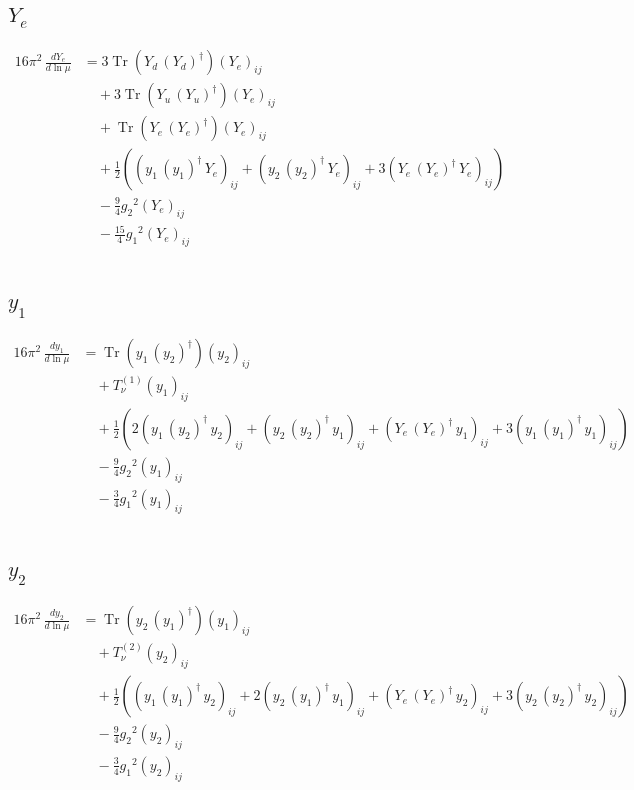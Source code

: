 \documentclass[10pt,a4paper]{article}
\begin{document}
\subsection*{$Y_e$}
\begin{align*}
16\pi^2\,\frac{d Y_e}{d\ln\mu} &=3 \operatorname{Tr}\!\left({Y_d}\,\left({Y_d}\right)^{\dagger}\right) \left({Y_e}\right)_{ij} \\
&\quad +3 \operatorname{Tr}\!\left({Y_u}\,\left({Y_u}\right)^{\dagger}\right) \left({Y_e}\right)_{ij} \\
&\quad +\operatorname{Tr}\!\left({Y_e}\,\left({Y_e}\right)^{\dagger}\right) \left({Y_e}\right)_{ij} \\
&\quad +\frac{1}{2} (\left({y_1}\,\left({y_1}\right)^{\dagger}\,{Y_e}\right)_{ij}+\left({y_2}\,\left({y_2}\right)^{\dagger}\,{Y_e}\right)_{ij}+3 \left({Y_e}\,\left({Y_e}\right)^{\dagger}\,{Y_e}\right)_{ij}) \\
&\quad -\frac{9}{4} {g_2}^2 \left({Y_e}\right)_{ij} \\
&\quad -\frac{15}{4} {g_1}^2 \left({Y_e}\right)_{ij} \\
\end{align*}
\subsection*{$y_1$}
\begin{align*}
16\pi^2\,\frac{d y_1}{d\ln\mu} &=\operatorname{Tr}\!\left({y_1}\,\left({y_2}\right)^{\dagger}\right) \left({y_2}\right)_{ij} \\
&\quad +T_{\nu}^{(1)} \left({y_1}\right)_{ij} \\
&\quad +\frac{1}{2} (2 \left({y_1}\,\left({y_2}\right)^{\dagger}\,{y_2}\right)_{ij}+\left({y_2}\,\left({y_2}\right)^{\dagger}\,{y_1}\right)_{ij}+\left({Y_e}\,\left({Y_e}\right)^{\dagger}\,{y_1}\right)_{ij}+3 \left({y_1}\,\left({y_1}\right)^{\dagger}\,{y_1}\right)_{ij}) \\
&\quad -\frac{9}{4} {g_2}^2 \left({y_1}\right)_{ij} \\
&\quad -\frac{3}{4} {g_1}^2 \left({y_1}\right)_{ij} \\
\end{align*}
\subsection*{$y_2$}
\begin{align*}
16\pi^2\,\frac{d y_2}{d\ln\mu} &=\operatorname{Tr}\!\left({y_2}\,\left({y_1}\right)^{\dagger}\right) \left({y_1}\right)_{ij} \\
&\quad +T_{\nu}^{(2)} \left({y_2}\right)_{ij} \\
&\quad +\frac{1}{2} (\left({y_1}\,\left({y_1}\right)^{\dagger}\,{y_2}\right)_{ij}+2 \left({y_2}\,\left({y_1}\right)^{\dagger}\,{y_1}\right)_{ij}+\left({Y_e}\,\left({Y_e}\right)^{\dagger}\,{y_2}\right)_{ij}+3 \left({y_2}\,\left({y_2}\right)^{\dagger}\,{y_2}\right)_{ij}) \\
&\quad -\frac{9}{4} {g_2}^2 \left({y_2}\right)_{ij} \\
&\quad -\frac{3}{4} {g_1}^2 \left({y_2}\right)_{ij} \\
\end{align*}
\end{document}
